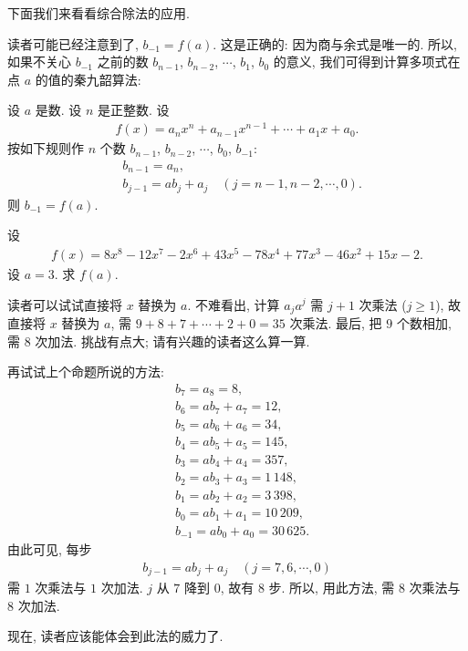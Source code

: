 \myLine

下面我们来看看综合除法的应用.

读者可能已经注意到了, $b_{-1} = f(a)$. 这是正确的: 因为商与余式是唯一的. 所以, 如果不关心 $b_{-1}$ 之前的数 $b_{n-1}$, $b_{n-2}$, $\cdots$, $b_1$, $b_0$ 的意义, 我们可得到计算多项式在点 $a$ 的值的秦九韶算法:
\begin{proposition}
    设 $a$ 是数. 设 $n$ 是正整数. 设
    \begin{align*}
        f(x) = a_n x^n + a_{n-1} x^{n-1} + \cdots + a_1 x + a_0.
    \end{align*}
    按如下规则作 $n$ 个数 $b_{n-1}$, $b_{n-2}$, $\cdots$, $b_0$, $b_{-1}$:
    \begin{align*}
         & b_{n-1} = a_n,                                     \\
         & b_{j-1} = ab_j + a_j \quad (j = n-1,n-2,\cdots,0).
    \end{align*}
    则 $b_{-1} = f(a)$.
\end{proposition}

\begin{example}
    设
    \begin{align*}
        f(x) = 8 x^8 - 12 x^7 - 2 x^6 + 43 x^5 - 78 x^4 + 77 x^3 - 46 x^2 + 15 x - 2.
    \end{align*}
    设 $a = 3$. 求 $f(a)$.

    读者可以试试直接将 $x$ 替换为 $a$. 不难看出, 计算 $a_j a^j$ 需 $j + 1$ 次乘法 ($j \geq 1$), 故直接将 $x$ 替换为 $a$, 需 $9 + 8 + 7 + \cdots + 2 + 0 = 35$ 次乘法. 最后, 把 $9$ 个数相加, 需 $8$ 次加法. 挑战有点大; 请有兴趣的读者这么算一算.

    再试试上个命题所说的方法:
    \begin{align*}
         & b_7 = a_8 = 8,                 \\
         & b_6 = ab_7 + a_7 = 12,         \\
         & b_5 = ab_6 + a_6 = 34,         \\
         & b_4 = ab_5 + a_5 = 145,        \\
         & b_3 = ab_4 + a_4 = 357,        \\
         & b_2 = ab_3 + a_3 = 1\,148,     \\
         & b_1 = ab_2 + a_2 = 3\,398,     \\
         & b_0 = ab_1 + a_1 = 10\,209,    \\
         & b_{-1} = ab_0 + a_0 = 30\,625.
    \end{align*}
    由此可见, 每步
    \begin{align*}
        b_{j-1} = ab_j + a_j \quad (j = 7, 6, \cdots, 0)
    \end{align*}
    需 $1$ 次乘法与 $1$ 次加法. $j$ 从 $7$ 降到 $0$, 故有 $8$ 步. 所以, 用此方法, 需 $8$ 次乘法与 $8$ 次加法.

    现在, 读者应该能体会到此法的威力了.
\end{example}


